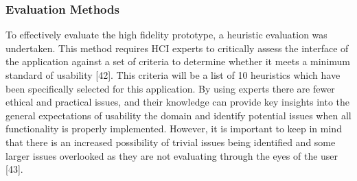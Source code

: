 \documentclass[a4 paper, 12pt]{article}
\begin{document}
    \subsubsection{Evaluation Methods}
    To effectively evaluate the high fidelity prototype, a heuristic evaluation was undertaken. This method requires HCI experts to critically assess the interface of the application against a set of criteria to determine whether it meets a minimum standard of usability [42]. This criteria will be a list of 10 heuristics which have been specifically selected for this application. By using experts there are fewer ethical and practical issues, and their knowledge can provide key insights into the general expectations of usability the domain and identify potential issues when all functionality is properly implemented. However, it is important to keep in mind that there is an increased possibility of trivial issues being identified and some larger issues overlooked as they are not evaluating through the eyes of the user [43].    
\end{document}
